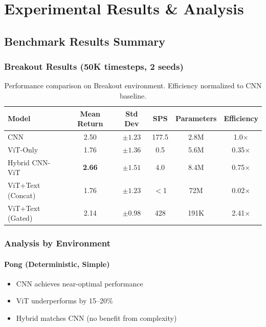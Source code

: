 \documentclass[12pt,a4paper,openany]{report}
\begin{document}
\chapter{Experimental Results \& Analysis}

\section{Benchmark Results Summary}

\subsection{Breakout Results (50K timesteps, 2 seeds)}

\begin{table}[H]
\centering
\small
\begin{tabular}{lccccc}
\toprule
Model & Mean Return & Std Dev & SPS & Parameters & Efficiency \\
\midrule
CNN & 2.50 & $\pm 1.23$ & 177.5 & 2.8M & 1.0$\times$ \\
ViT-Only & 1.76 & $\pm 1.36$ & 0.5 & 5.6M & 0.35$\times$ \\
Hybrid CNN-ViT & \textbf{2.66} & $\pm 1.51$ & 4.0 & 8.4M & 0.75$\times$ \\
ViT+Text (Concat) & 1.76 & $\pm 1.23$ & $<$1 & 72M & 0.02$\times$ \\
ViT+Text (Gated) & 2.14 & $\pm 0.98$ & 428 & 191K & 2.41$\times$ \\
\bottomrule
\end{tabular}
\caption{Performance comparison on Breakout environment. Efficiency normalized to CNN baseline.}
\end{table}

\subsection{Analysis by Environment}

\subsubsection{Pong (Deterministic, Simple)}

\begin{itemize}
    \item CNN achieves near-optimal performance
    \item ViT underperforms by 15--20\%
    \item Hybrid matches CNN (no benefit from complexity)
\end{itemize}
\end{document}

